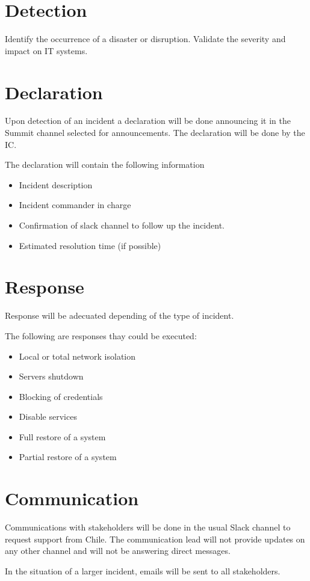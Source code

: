 \section{Detection}

Identify the occurrence of a disaster or disruption.
Validate the severity and impact on IT systems.

\section{Declaration}

Upon detection of an incident a declaration will be done announcing it in the Summit channel selected for announcements. The declaration will be done by the IC.

The declaration will contain the following information

\begin{itemize}
    \item Incident description
    \item Incident commander in charge
    \item Confirmation of slack channel to follow up the incident. 
    \item Estimated resolution time (if possible)
\end{itemize}

\section{Response}

Response will be adecuated depending of the type of incident.

The following are responses thay could be executed:

\begin{itemize}
    \item Local or total network isolation
    \item Servers shutdown
    \item Blocking of credentials 
    \item Disable services
    \item Full restore of a system
    \item Partial restore of a system
\end{itemize}

\section{Communication}

Communications with stakeholders will be done in the usual Slack channel to request support from Chile. The communication lead will not provide updates on any other channel and will not be answering direct messages.

In the situation of a larger incident, emails will be sent to all stakeholders.